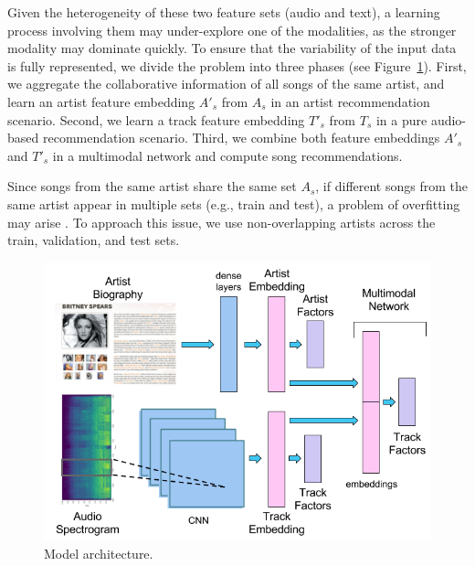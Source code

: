 Given the heterogeneity of these two feature sets (audio and text), a learning process involving them may under-explore one of the modalities, as the stronger modality may dominate quickly. 
To ensure that the variability of the input data is fully represented, we divide the problem into three phases (see Figure~\ref{fig:approach}). First, we aggregate the collaborative information of all songs of the same artist, and learn an artist feature embedding $A'_{s}$ from $A_{s}$ in an artist recommendation scenario. Second, we learn a track feature embedding $T'_{s}$ from $T_{s}$ in a pure audio-based recommendation scenario. Third, we combine both feature embeddings $A'_{s}$ and $T'_{s}$ in a multimodal network and compute song recommendations. 

Since songs from the same artist share the same set $A_{s}$, if different songs from the same artist appear in multiple sets (e.g., train and test), a problem of overfitting may arise \citep{Flexer2007ACL}.
To approach this issue, we use non-overlapping artists across the train, validation, and test sets.



\begin{figure}[!htp]
\centerline{
\includegraphics[width=0.75\columnwidth]{ch08_cold-rec_pics/approach.png}}
\caption{Model architecture.}
\label{fig:approach}
\end{figure}

